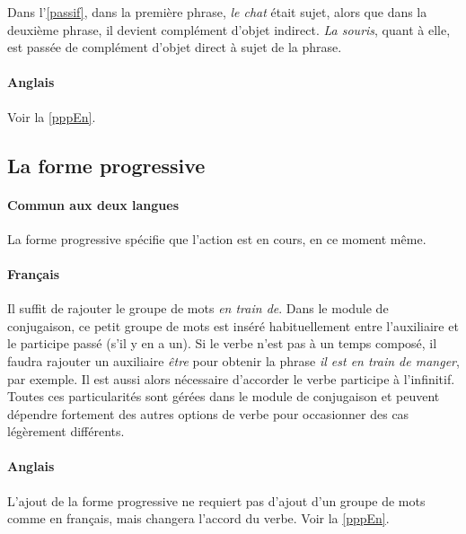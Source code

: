 \documentclass[11pt]{article} %
\begin{document}
Dans l'\autoref{passif}, dans la première phrase, \emph{le chat} était sujet, alors que dans la
deuxième phrase, il devient complément d'objet indirect. \emph{La souris}, quant à elle, 
est passée de complément d'objet direct à sujet de la phrase.

\paragraph{Anglais} Voir la \autoref{pppEn}.

\subsection{La forme progressive}

\paragraph{Commun aux deux langues}
La forme progressive spécifie que l'action est en cours, en ce moment même. 

\paragraph{Français}
Il suffit de rajouter le groupe de
mots \emph{en train de}. Dans le module de conjugaison, ce petit groupe de
mots est inséré habituellement entre l'auxiliaire et le participe
passé (s'il y en a un). Si le verbe n'est pas à un temps composé,
il faudra rajouter un auxiliaire \emph{être }pour obtenir la phrase
\emph{il est en train de manger}, par exemple. Il est aussi alors
nécessaire d'accorder le verbe participe à l'infinitif. Toutes ces
particularités sont gérées dans le module de conjugaison et peuvent
dépendre fortement des autres options de verbe pour occasionner des
cas légèrement différents.

\paragraph{Anglais} L'ajout de la forme progressive ne requiert pas
d'ajout d'un groupe de mots comme en français, mais changera l'accord
du verbe. Voir la \autoref{pppEn}.
\end{document}
